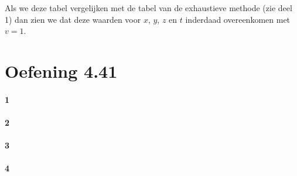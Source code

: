 \documentclass[12pt]{article}
\begin{document}
Als we deze tabel vergelijken met de tabel van de exhaustieve methode (zie deel 1) dan zien we dat deze waarden voor $x$, $y$, $z$ en $t$ inderdaad overeenkomen met $v=1$.

\section{Oefening 4.41}
\paragraph{1}

\paragraph{2}

\paragraph{3}

\paragraph{4}
\end{document}
